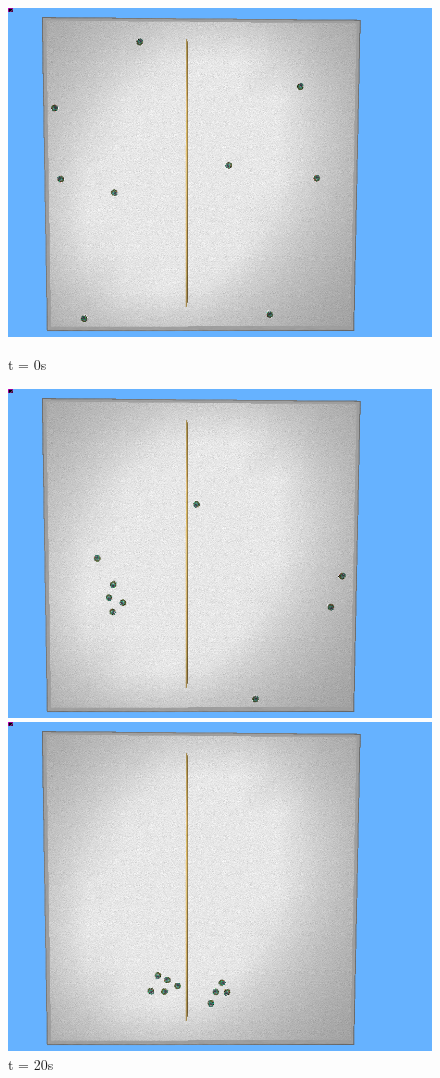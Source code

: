 \begin{figure}[!h]
	\centering
	\begin{minipage}{.5\textwidth}
		\centering
		\includegraphics[width=.75\linewidth]{segregate1}
		\caption*{t = 0s}
		\label{fig:seg1}
	\end{minipage}%
	\begin{minipage}{.5\textwidth}
		\centering
		\includegraphics[width=.75\linewidth]{segregate2}
		\caption*{t = 20s}
		\label{fig:seg2}
	\end{minipage}
	\begin{minipage}{.5\textwidth}
		\centering
		\includegraphics[width=.75\linewidth]{segregate3}

\end{minipage}
\end{figure}
